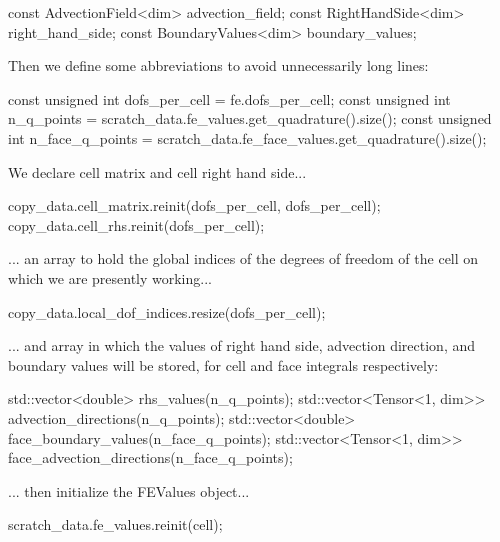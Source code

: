 \begin{DoxyCode}
\textcolor{keyword}{const} AdvectionField<dim> advection\_field;
\textcolor{keyword}{const} RightHandSide<dim> right\_hand\_side;
\textcolor{keyword}{const} BoundaryValues<dim> boundary\_values;
\end{DoxyCode}


Then we define some abbreviations to avoid unnecessarily long lines\+:


\begin{DoxyCode}
\textcolor{keyword}{const} \textcolor{keywordtype}{unsigned} \textcolor{keywordtype}{int} dofs\_per\_cell = fe.dofs\_per\_cell;
\textcolor{keyword}{const} \textcolor{keywordtype}{unsigned} \textcolor{keywordtype}{int} n\_q\_points =
    scratch\_data.fe\_values.get\_quadrature().size();
\textcolor{keyword}{const} \textcolor{keywordtype}{unsigned} \textcolor{keywordtype}{int} n\_face\_q\_points =
    scratch\_data.fe\_face\_values.get\_quadrature().size();
\end{DoxyCode}


We declare cell matrix and cell right hand side...


\begin{DoxyCode}
copy\_data.cell\_matrix.reinit(dofs\_per\_cell, dofs\_per\_cell);
copy\_data.cell\_rhs.reinit(dofs\_per\_cell);
\end{DoxyCode}


... an array to hold the global indices of the degrees of freedom of the cell on which we are presently working...


\begin{DoxyCode}
copy\_data.local\_dof\_indices.resize(dofs\_per\_cell);
\end{DoxyCode}


... and array in which the values of right hand side, advection direction, and boundary values will be stored, for cell and face integrals respectively\+:


\begin{DoxyCode}
std::vector<double> rhs\_values(n\_q\_points);
std::vector<Tensor<1, dim>> advection\_directions(n\_q\_points);
std::vector<double> face\_boundary\_values(n\_face\_q\_points);
std::vector<Tensor<1, dim>> face\_advection\_directions(n\_face\_q\_points);
\end{DoxyCode}


... then initialize the {\ttfamily F\+E\+Values} object...


\begin{DoxyCode}
scratch\_data.fe\_values.reinit(cell);
\end{DoxyCode}


